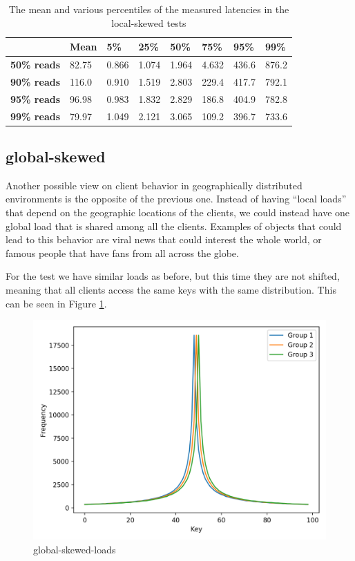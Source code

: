 \begin{table}[!htb]
  \centering
  \begin{tabular}{l l l l l l l l}
    \hline
    & \textbf{Mean} & \textbf{5\%} & \textbf{25\%} & \textbf{50\%} & \textbf{75\%} & \textbf{95\%}& \textbf{99\%} \\
    \hline
    \textbf{50\% reads} & 82.75 & 0.866 & 1.074 & 1.964 & 4.632 & 436.6 & 876.2 \\
    \textbf{90\% reads} & 116.0 & 0.910 & 1.519 & 2.803 & 229.4 & 417.7 & 792.1 \\
    \textbf{95\% reads} & 96.98 & 0.983 & 1.832 & 2.829 & 186.8 & 404.9 & 782.8 \\
    \textbf{99\% reads} & 79.97 & 1.049 & 2.121 & 3.065 & 109.2 & 396.7 &  733.6 \\
    \hline
  \end{tabular}
  \caption{The mean and various percentiles of the measured latencies in the local-skewed tests}\label{tab:local-latencies-table}
\end{table}


\subsection{global-skewed}\label{sec:global-skewed}
Another possible view on client behavior in geographically distributed environments is the opposite of the previous one. Instead of having ``local loads'' that depend on the geographic locations of the clients, we could instead have one global load that is shared among all the clients. Examples of objects that could lead to this behavior are viral news that could interest the whole world, or famous people that have fans from all across the globe.

For the test we have similar loads as before, but this time they are not shifted, meaning that all clients access the same keys with the same distribution. This can be seen in Figure \ref{fig:global-skewed-loads}.

\begin{figure}[!htb]
  \centering
  \includegraphics[width=\textwidth,height=\textheight,keepaspectratio]{img/clients_loads_global.png}
  \caption{ global-skewed-loads }
  \label{fig:global-skewed-loads}
\end{figure}

